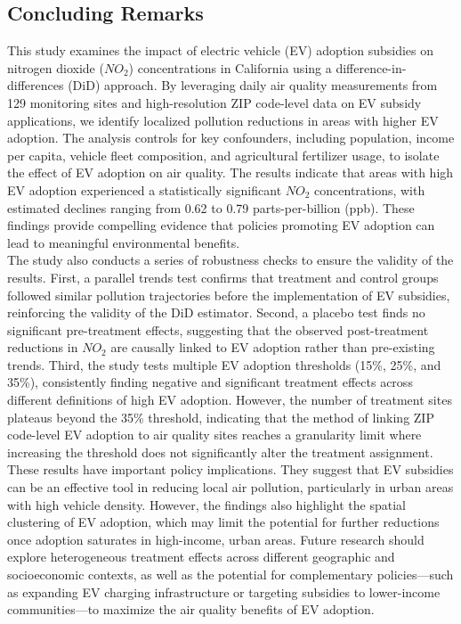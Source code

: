 \documentclass[12pt]{article}
\newcommand\tab[1][.50cm]{\hspace*{#1}}
\begin{document}
	\begin{multicols}{2}
		\section*{Concluding Remarks}
		
		This study examines the impact of electric vehicle (EV) adoption subsidies on nitrogen dioxide ($NO_2$) concentrations in California using a difference-in-differences (DiD) approach. By leveraging daily air quality measurements from 129 monitoring sites and high-resolution ZIP code-level data on EV subsidy applications, we identify localized pollution reductions in areas with higher EV adoption. The analysis controls for key confounders, including population, income per capita, vehicle fleet composition, and agricultural fertilizer usage, to isolate the effect of EV adoption on air quality. The results indicate that areas with high EV adoption experienced a statistically significant $NO_2$  concentrations, with estimated declines ranging from 0.62 to 0.79 parts-per-billion (ppb). These findings provide compelling evidence that policies promoting EV adoption can lead to meaningful environmental benefits.\\ 
		\tab The study also conducts a series of robustness checks to ensure the validity of the results. First, a parallel trends test confirms that treatment and control groups followed similar pollution trajectories before the implementation of EV subsidies, reinforcing the validity of the DiD estimator. Second, a placebo test finds no significant pre-treatment effects, suggesting that the observed post-treatment reductions in $NO_2$ are causally linked to EV adoption rather than pre-existing trends. Third, the study tests multiple EV adoption thresholds (15\%, 25\%, and 35\%), consistently finding negative and significant treatment effects across different definitions of high EV adoption. However, the number of treatment sites plateaus beyond the 35\% threshold, indicating that the method of linking ZIP code-level EV adoption to air quality sites reaches a granularity limit where increasing the threshold does not significantly alter the treatment assignment.\\ 
		\tab These results have important policy implications. They suggest that EV subsidies can be an effective tool in reducing local air pollution, particularly in urban areas with high vehicle density. However, the findings also highlight the spatial clustering of EV adoption, which may limit the potential for further reductions once adoption saturates in high-income, urban areas. Future research should explore heterogeneous treatment effects across different geographic and socioeconomic contexts, as well as the potential for complementary policies—such as expanding EV charging infrastructure or targeting subsidies to lower-income communities—to maximize the air quality benefits of EV adoption. 
		
	\end{multicols}
	\pagebreak
	
\end{document}
